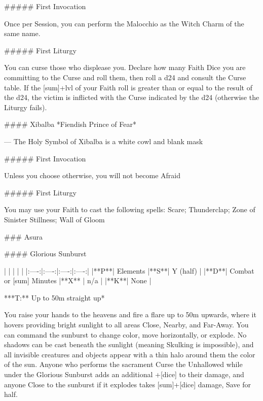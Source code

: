 ##### First Invocation

Once per Session, you can perform the Malocchio as the Witch Charm of the same name.


##### First Liturgy

You can curse those who displease you.  Declare how many Faith Dice you are committing to the Curse and roll them, then roll a d24 and consult the Curse table.  If the [sum]+{lvl} of your Faith roll is greater than or equal to the result of the d24, the victim is inflicted with the Curse indicated by the d24 (otherwise the Liturgy fails).




#### Xibalba
*Fiendish Prince of Fear*

---
The Holy Symbol of Xibalba is a white cowl and blank mask

##### First Invocation

Unless you choose otherwise, you will not become Afraid

##### First Liturgy

You may use your Faith to cast the following spells: Scare; Thunderclap; Zone of Sinister Stillness; Wall of Gloom










### Asura





#### Glorious Sunburst

| | | | |
|:----:|:----:|:----:|:----:|
|**P**| Elements |**S**|  Y (half) |
|**D**| Combat or [sum] Minutes |**X** |  n/a  |
|**K**| None |

***T:**   Up to 50m straight up*



You raise your hands to the heavens and fire a flare up to 50m upwards, where it hovers providing bright sunlight to all areas Close, Nearby, and Far-Away.  You can command the sunburst to change color, move horizontally, or explode.  No shadows can be cast beneath the sunlight (meaning Skulking is impossible), and all invisible creatures and objects appear with a thin halo around them the color of the sun.  Anyone who performs the sacrament Curse the Unhallowed while under the Glorious Sunburst adds an additional +[dice] to their damage, and anyone Close to the sunburst if it explodes takes [sum]+[dice] damage, Save for half.




